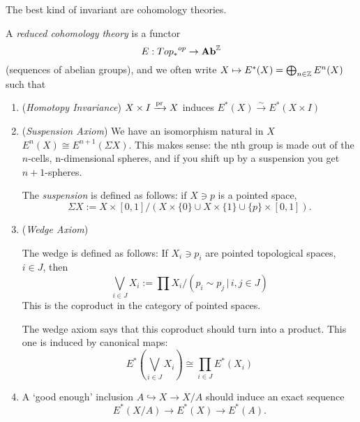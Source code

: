 \documentclass[class=report, crop=false,a4paper,twoside]{standalone}
\begin{document}
The best kind of invariant are cohomology theories.
\begin{definition}
	A \emph{reduced cohomology theory} is a functor 
	\[
	E: {Top_*}^{op} \to \mathbf{Ab}^{\mathbb{Z}}
	\]
	(sequences of abelian groups), and we often write $X \mapsto E^*(X) = \bigoplus_{n \in \mathbb{Z}} E^n(X)$ such that

	\begin{enumerate}
		\item (\emph{Homotopy Invariance})
		  $X \times I \xrightarrow{\operatorname{pr}} X$ induces $E^*(X) \xrightarrow{\sim} E^*(X \times I)$
		  
		\item (\emph{Suspension Axiom}) We have an isomorphism natural in $X$ $E^n(X) \cong E^{n+1}(\Sigma X)$. This makes sense: the nth group is made out of the $n$-cells, n-dimensional spheres, and if you shift up by a suspension you get $n+1$-spheres.

		\begin{remark}
			The \emph{suspension} is defined as follows: if $X \ni p$ is a pointed space, 
			\[
			\Sigma X := X \times [0,1]/(X \times \{0\} \cup X \times \{1\} \cup \{p\} \times [0,1]).
			\]
		\end{remark}

		\item (\emph{Wedge Axiom}) 

		\begin{remark}
			The wedge is defined as follows: If $X_i \ni p_i$ are pointed topological spaces, $i \in J$, then
			\[
			\bigvee_{i \in J}X_i := \prod X_i/(p_i \sim p_j \,|\, i,j \in J)
			\]
			This is the coproduct in the category of pointed spaces.
		\end{remark}

		The wedge axiom says that this coproduct should turn into a product. This one is induced by canonical maps:
		\[
		E^*(\bigvee_{i \in J} X_i )\cong \prod_{i \in J} E^*(X_i)
		\]

		\item A `good enough' inclusion $A \hookrightarrow X \to X/A$ should induce an exact sequence
		\[
		E^*(X/A) \to E^*(X) \to E^*(A).
		\]
	\end{enumerate}
\end{definition}
\end{document}
